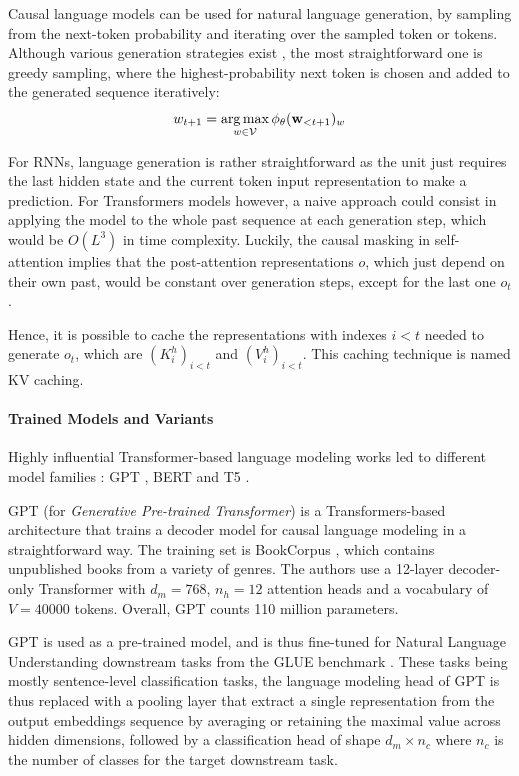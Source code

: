 Causal language models can be used for natural language generation, by sampling from the next-token probability and iterating over the sampled token or tokens. Although various generation strategies exist \citep{fan-etal-2018-hierarchical, wang2020contextual, nucleus_sampling}, the most straightforward one is greedy sampling, where the highest-probability next token is chosen and added to the generated sequence iteratively:
$$
w_{t+1} = \operatorname*{arg\,max}_{w \in \mathcal{V}}\phi_{\theta}(\mathbf{w}_{<t+1})_w
$$

For RNNs, language generation is rather straightforward as the unit just requires the last hidden state and the current token input representation to make a prediction. For Transformers models however, a naive approach could consist in applying the model to the whole past sequence at each generation step, which would be $O(L^3)$ in time complexity. Luckily, the causal masking in self-attention implies that the post-attention representations $o$, which just depend on their own past, would be constant over generation steps, except for the last one $o_t$.

Hence, it is possible to cache the representations with indexes $i < t$ needed to generate $o_t$, which are $(K^h_i)_{i<t}$ and $(V^h_i)_{i<t}$. This caching technique is named KV caching.

\paragraph{Trained Models and Variants}
Highly influential Transformer-based language modeling works led to different model families : GPT \citep{Radford2018ImprovingLU}, BERT \citep{devlin-etal-2019-bert} and T5 \citep{2020t5}.

GPT (for \textit{Generative Pre-trained Transformer}) is a Transformers-based architecture that trains a decoder model for causal language modeling in a straightforward way. The training set is BookCorpus \citep{bookcorpus}, which contains unpublished books from a variety of genres. The authors use a 12-layer decoder-only Transformer with $d_m=768$, $n_h=12$ attention heads and a vocabulary of $V=40000$ tokens. Overall, GPT counts 110 million parameters.

GPT is used as a pre-trained model, and is thus fine-tuned for Natural Language Understanding downstream tasks from the GLUE benchmark \citep{wang-etal-2018-glue}. These tasks being mostly sentence-level classification tasks, the language modeling head of GPT is thus replaced with a pooling layer that extract a single representation from the output embeddings sequence by averaging or retaining the maximal value across hidden dimensions, followed by a classification head of shape $d_m \times n_c$ where $n_c$ is the number of classes for the target downstream task.

